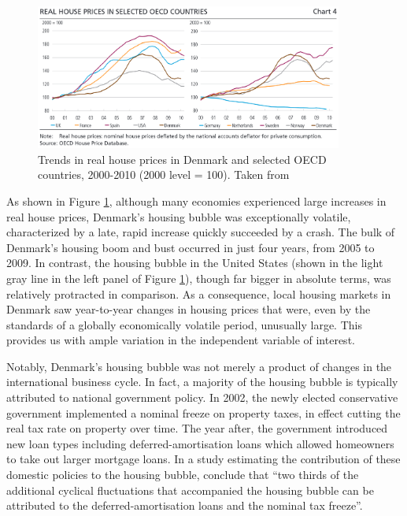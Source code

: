 \documentclass[12pt,a4paper]{article}
\begin{document}
\begin{figure}[htbp!]
	\includegraphics[width=0.9\textwidth]{../figures/intcomparison}
	\centering
	\caption{ Trends in real house prices in Denmark and selected OECD countries, 2000-2010 (2000 level = 100).  Taken from \citet[p. 50]{dam2011housing}}\label{dam}
\end{figure}

As shown in Figure \ref{dam}, although many economies experienced large increases in real house prices, Denmark's housing bubble was exceptionally volatile, characterized by a late, rapid increase quickly succeeded by a crash. The bulk of Denmark's housing boom and bust occurred in just four years, from 2005 to 2009. In contrast, the housing bubble in the United States (shown in the light gray line in the left panel of Figure \ref{dam}), though far bigger in absolute terms, was relatively protracted in comparison. As a consequence, local housing markets in Denmark saw year-to-year changes in housing prices that were, even by the standards of a globally economically volatile period, unusually large. This provides us with ample variation in the independent variable of interest.

Notably, Denmark's housing bubble was not merely a product of changes in the international business cycle. In fact, a majority of the housing bubble is typically attributed to national government policy. In 2002, the newly elected conservative government implemented a nominal freeze on property taxes, in effect cutting the real tax rate on property over time. The year after, the government introduced new loan types including deferred-amortisation loans which allowed homeowners to take out larger mortgage loans. In a study estimating the contribution of these domestic policies to the housing bubble, \citet[p. 62]{dam2011housing} conclude that ``two  thirds  of  the  additional  cyclical  fluctuations  that  accompanied  the  housing  bubble  can  be  attributed to the deferred-amortisation loans and the nominal tax freeze''.
\end{document}
